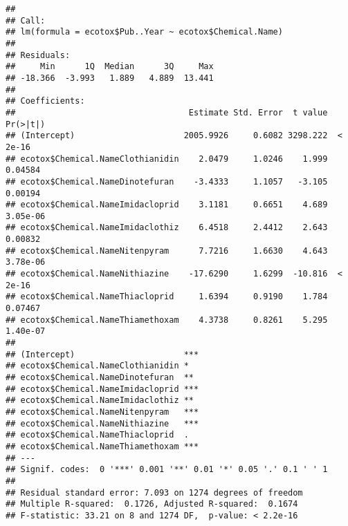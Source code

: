 \documentclass[]{article}
\newenvironment{Shaded}{\begin{snugshade}}{\end{snugshade}}
\newcommand{\KeywordTok}[1]{\textcolor[rgb]{0.13,0.29,0.53}{\textbf{#1}}}
\newcommand{\DataTypeTok}[1]{\textcolor[rgb]{0.13,0.29,0.53}{#1}}
\newcommand{\FloatTok}[1]{\textcolor[rgb]{0.00,0.00,0.81}{#1}}
\newcommand{\StringTok}[1]{\textcolor[rgb]{0.31,0.60,0.02}{#1}}
\newcommand{\CommentTok}[1]{\textcolor[rgb]{0.56,0.35,0.01}{\textit{#1}}}
\newcommand{\OperatorTok}[1]{\textcolor[rgb]{0.81,0.36,0.00}{\textbf{#1}}}
\newcommand{\NormalTok}[1]{#1}
\begin{document}
\begin{Shaded}
\end{Shaded}

\begin{verbatim}
## 
## Call:
## lm(formula = ecotox$Pub..Year ~ ecotox$Chemical.Name)
## 
## Residuals:
##     Min      1Q  Median      3Q     Max 
## -18.366  -3.993   1.889   4.889  13.441 
## 
## Coefficients:
##                                   Estimate Std. Error  t value Pr(>|t|)
## (Intercept)                      2005.9926     0.6082 3298.222  < 2e-16
## ecotox$Chemical.NameClothianidin    2.0479     1.0246    1.999  0.04584
## ecotox$Chemical.NameDinotefuran    -3.4333     1.1057   -3.105  0.00194
## ecotox$Chemical.NameImidacloprid    3.1181     0.6651    4.689 3.05e-06
## ecotox$Chemical.NameImidaclothiz    6.4518     2.4412    2.643  0.00832
## ecotox$Chemical.NameNitenpyram      7.7216     1.6630    4.643 3.78e-06
## ecotox$Chemical.NameNithiazine    -17.6290     1.6299  -10.816  < 2e-16
## ecotox$Chemical.NameThiacloprid     1.6394     0.9190    1.784  0.07467
## ecotox$Chemical.NameThiamethoxam    4.3738     0.8261    5.295 1.40e-07
##                                     
## (Intercept)                      ***
## ecotox$Chemical.NameClothianidin *  
## ecotox$Chemical.NameDinotefuran  ** 
## ecotox$Chemical.NameImidacloprid ***
## ecotox$Chemical.NameImidaclothiz ** 
## ecotox$Chemical.NameNitenpyram   ***
## ecotox$Chemical.NameNithiazine   ***
## ecotox$Chemical.NameThiacloprid  .  
## ecotox$Chemical.NameThiamethoxam ***
## ---
## Signif. codes:  0 '***' 0.001 '**' 0.01 '*' 0.05 '.' 0.1 ' ' 1
## 
## Residual standard error: 7.093 on 1274 degrees of freedom
## Multiple R-squared:  0.1726, Adjusted R-squared:  0.1674 
## F-statistic: 33.21 on 8 and 1274 DF,  p-value: < 2.2e-16
\end{verbatim}

\begin{Shaded}
\end{Shaded}
\end{document}
